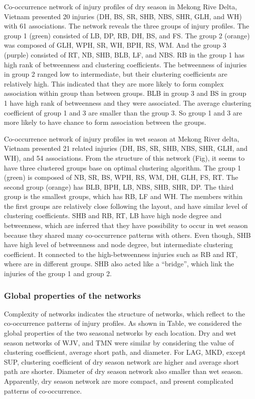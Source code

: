Co-occurrence network of injury profiles of dry season in Mekong Rive Delta, Vietnam presented 20 injuries (DH, BS, SR, SHB, NBS, SHR, GLH, and WH) with 61 associations. The network reveals the three groups of injury profiles. The group 1 (green) consisted of LB, DP, RB, DH, BS, and FS. The group 2 (orange) was composed of GLH, WPH, SR, WH, BPH, RS, WM. And the group 3 (purple) consisted of RT, NB, SHB, BLB, LF, and NBS. RB in the group 1 has high rank of betweenness and clustering coefficients. The betweenness of injuries in group 2 ranged low to intermediate, but their clustering coefficients are relatively high. This indicated that they are more likely to form complex association within group than between groups. BLB in group 3 and BS in group 1 have high rank of betweenness and they were associated. The average clustering coefficient of group 1 and 3 are smaller than the group 3. So group 1 and 3 are more likely to have chance to form association between the groups.

Co-occurrence network of injury profiles in wet season at Mekong River delta, Vietnam presented 21 related injuries (DH, BS, SR, SHB, NBS, SHR, GLH, and WH), and 54 associations. From the structure of this network (Fig), it seems to have three clustered groups base on optimal clustering algorithm. The group 1 (green) is composed of NB, SR, BS, WPH, RS, WM, DH, GLH, FS, RT. The second group (orange) has BLB, BPH, LB, NBS, SHB, SHR, DP. The third group is the smallest groups, which has RB, LF and WH. The members within the first groups are relatively close following the layout, and have similar level of clustering coefficients. SHB and RB, RT, LB have high node degree and betweenness, which are inferred that they have possibility to occur in wet season because they shared many co-occurrence patterns with others. Even though, SHB have high level of betweenness and node degree, but intermediate clustering coefficient.  It connected to the high-betweenness injuries such as RB and RT, where are in different groups. SHB also acted like a ``bridge'', which link the injuries of the group 1 and group 2.

\subsubsection{Global properties of the networks}

Complexity of networks indicates the structure of networks, which reflect to the co-occurrence patterns of injury profiles. As shown in Table, we considered the global properties of the two seasonal networks by each location. Dry and wet season networks of WJV, and TMN were similar by considering the value of clustering coefficient, average short path, and diameter. For LAG, MKD, except SUP, clustering coefficient of dry season network are higher and average short path are shorter. Diameter of dry season network also smaller than wet season. Apparently, dry season network are more compact, and present complicated patterns of co-occurrence. 






